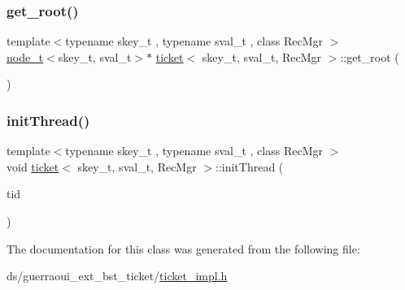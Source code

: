 \mbox{\label{classticket_a045f514bd329f9e22e62ef6671d07833}} 
\subsubsection{\texorpdfstring{get\+\_\+root()}{get\_root()}}
{\footnotesize\ttfamily template$<$typename skey\+\_\+t , typename sval\+\_\+t , class Rec\+Mgr $>$ \\
\hyperlink{structnode__t}{node\+\_\+t}$<$skey\+\_\+t, sval\+\_\+t$>$$\ast$ \hyperlink{classticket}{ticket}$<$ skey\+\_\+t, sval\+\_\+t, Rec\+Mgr $>$\+::get\+\_\+root (\begin{DoxyParamCaption}{ }\end{DoxyParamCaption})\hspace{0.3cm}{\ttfamily [inline]}}

\mbox{\label{classticket_a87fe7b99876fa33696c931c234051d54}} 
\subsubsection{\texorpdfstring{init\+Thread()}{initThread()}}
{\footnotesize\ttfamily template$<$typename skey\+\_\+t , typename sval\+\_\+t , class Rec\+Mgr $>$ \\
void \hyperlink{classticket}{ticket}$<$ skey\+\_\+t, sval\+\_\+t, Rec\+Mgr $>$\+::init\+Thread (\begin{DoxyParamCaption}\item[{const int}]{tid }\end{DoxyParamCaption})\hspace{0.3cm}{\ttfamily [inline]}}



The documentation for this class was generated from the following file\+:\begin{DoxyCompactItemize}
\item 
ds/guerraoui\+\_\+ext\+\_\+bst\+\_\+ticket/\hyperlink{ticket__impl_8h}{ticket\+\_\+impl.\+h}\end{DoxyCompactItemize}
